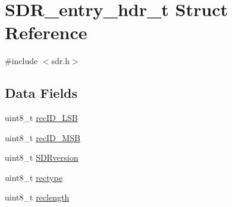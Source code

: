\hypertarget{structSDR__entry__hdr__t}{\section{S\-D\-R\-\_\-entry\-\_\-hdr\-\_\-t Struct Reference}
\label{structSDR__entry__hdr__t}
}


{\ttfamily \#include $<$sdr.\-h$>$}

\subsection*{Data Fields}
\begin{DoxyCompactItemize}
\item 
uint8\-\_\-t \hyperlink{structSDR__entry__hdr__t_aa42c489cffc253ab49b2ee04c250f38e}{rec\-I\-D\-\_\-\-L\-S\-B}
\item 
uint8\-\_\-t \hyperlink{structSDR__entry__hdr__t_a9aeb62c0c190701d5342404a2576cef7}{rec\-I\-D\-\_\-\-M\-S\-B}
\item 
uint8\-\_\-t \hyperlink{structSDR__entry__hdr__t_a8d06627216139b97797973df3bbbece6}{S\-D\-Rversion}
\item 
uint8\-\_\-t \hyperlink{structSDR__entry__hdr__t_adb25537f9b930206e504398b3333b2bf}{rectype}
\item 
uint8\-\_\-t \hyperlink{structSDR__entry__hdr__t_a0a0a857aa1ab240608864c441a513903}{reclength}
\end{DoxyCompactItemize}


